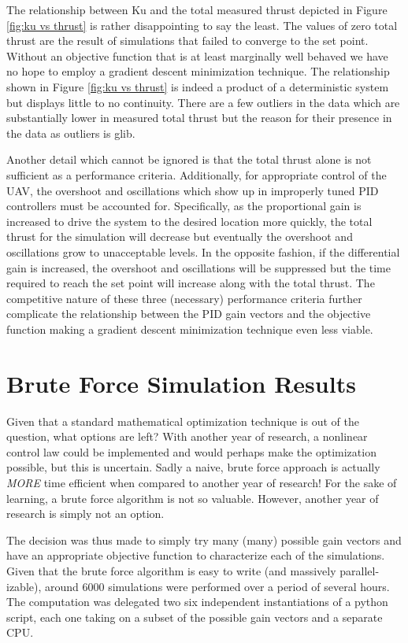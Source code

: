 The relationship between Ku and the total measured thrust depicted in Figure \ref{fig:ku vs thrust} is rather disappointing to say the least. The values of zero total thrust are the result of simulations that failed to converge to the set point. Without an objective function that is at least marginally well behaved we have no hope to employ a gradient descent minimization technique. The relationship shown in Figure \ref{fig:ku vs thrust} is indeed a product of a deterministic system but displays little to no continuity. There are a few outliers in the data which are substantially lower in measured total thrust but the reason for their presence in the data as outliers is glib. 

Another detail which cannot be ignored is that the total thrust alone is not sufficient as a performance criteria. Additionally, for appropriate control of the UAV,  the overshoot and oscillations which show up in improperly tuned PID controllers must be accounted for. Specifically, as the proportional gain is increased to drive the system to the desired location more quickly, the total thrust for the simulation will decrease but eventually the overshoot and oscillations grow to unacceptable levels. In the opposite fashion, if the differential gain is increased, the overshoot and oscillations will be suppressed but the time required to reach the set point will increase along with the total thrust. The competitive nature of these three (necessary) performance criteria further complicate the relationship between the PID gain vectors and the objective function making a gradient descent minimization technique even less viable. 

 
\section{Brute Force Simulation Results}

Given that a standard mathematical optimization technique is out of the question, what options are left? With another year of research, a nonlinear control law could be implemented and would perhaps make the optimization possible, but this is uncertain. Sadly a naive, brute force approach is actually \textit{MORE} time efficient when compared to another year of research! For the sake of learning, a brute force algorithm is not so valuable. However, another year of research is simply not an option.

The decision was thus made to simply try many (many) possible gain vectors and have an appropriate objective function to characterize each of the simulations. Given that  the brute force algorithm is easy to write (and massively parallel-izable), around 6000 simulations were performed over a period of several hours. The computation was delegated two six independent instantiations of a python script, each one taking on a subset of the possible gain vectors and a separate CPU. 

